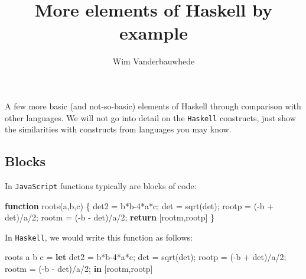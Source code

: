 \documentclass[11pt]{amsart}
\title{More elements of Haskell by example}
\author{Wim Vanderbauwhede}
\newenvironment{Shaded}{}{}
\newcommand{\KeywordTok}[1]{\textcolor[rgb]{0.00,0.44,0.13}{\textbf{{#1}}}}
\newcommand{\DecValTok}[1]{\textcolor[rgb]{0.25,0.63,0.44}{{#1}}}
\newcommand{\FunctionTok}[1]{\textcolor[rgb]{0.02,0.16,0.49}{{#1}}}
\newcommand{\NormalTok}[1]{{#1}}
\begin{document}
\maketitle



A few more basic (and not-so-basic) elements of Haskell through
comparison with other languages. We will not go into detail on the
\texttt{Haskell} constructs, just show the similarities with constructs
from languages you may know.

\subsection{Blocks}\label{blocks}

In \texttt{JavaScript} functions typically are blocks of code:

\begin{Shaded}
\begin{Highlighting}[]
    \KeywordTok{function} \FunctionTok{roots}\NormalTok{(a,b,c) \{}
        \NormalTok{det2 = b*b}\DecValTok{-4}\NormalTok{*a*c;}
        \NormalTok{det  = }\FunctionTok{sqrt}\NormalTok{(det);}
        \NormalTok{rootp = (-b + det)/a/}\DecValTok{2}\NormalTok{;}
        \NormalTok{rootm = (-b - det)/a/}\DecValTok{2}\NormalTok{;}
        \KeywordTok{return} \NormalTok{[rootm,rootp]}
    \NormalTok{\}}
\end{Highlighting}
\end{Shaded}

In \texttt{Haskell}, we would write this function as follows:

\begin{Shaded}
\begin{Highlighting}[]
    \NormalTok{roots a b c }\FunctionTok{=} 
        \KeywordTok{let}
            \NormalTok{det2 }\FunctionTok{=} \NormalTok{b}\FunctionTok{*}\NormalTok{b}\FunctionTok{-}\DecValTok{4}\FunctionTok{*}\NormalTok{a}\FunctionTok{*}\NormalTok{c;}
            \NormalTok{det  }\FunctionTok{=} \NormalTok{sqrt(det);}
            \NormalTok{rootp }\FunctionTok{=} \NormalTok{(}\FunctionTok{-}\NormalTok{b }\FunctionTok{+} \NormalTok{det)}\FunctionTok{/}\NormalTok{a}\FunctionTok{/}\DecValTok{2}\NormalTok{;}
            \NormalTok{rootm }\FunctionTok{=} \NormalTok{(}\FunctionTok{-}\NormalTok{b }\FunctionTok{-} \NormalTok{det)}\FunctionTok{/}\NormalTok{a}\FunctionTok{/}\DecValTok{2}\NormalTok{;}
        \KeywordTok{in}
            \NormalTok{[rootm,rootp]}
\end{Highlighting}
\end{Shaded}
\end{document}
